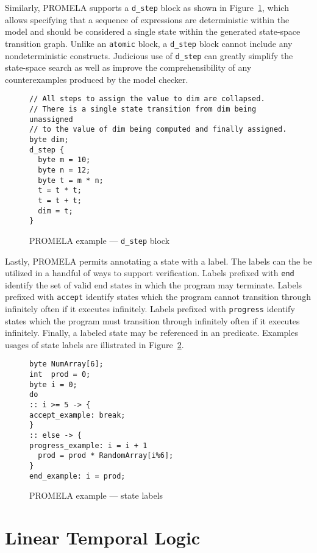 Similarly, PROMELA supports a \texttt{d\_step} block as shown in Figure\ \ref{fig:dstep}, which allows specifying that a sequence of expressions are deterministic within the model and should be considered a single state within the generated state-space transition graph.
Unlike an \texttt{atomic} block, a \texttt{d\_step} block cannot include any nondeterministic constructs.
Judicious use of \texttt{d\_step} can greatly simplify the state-space search as well as improve the comprehensibility of any counterexamples produced by the model checker.

\begin{figure}
\centering
\caption{\label{fig:dstep}PROMELA example --- \texttt{d\_step} block}
\begin{verbatim}
// All steps to assign the value to dim are collapsed.
// There is a single state transition from dim being unassigned
// to the value of dim being computed and finally assigned.
byte dim;
d_step {
  byte m = 10;
  byte n = 12;
  byte t = m * n; 
  t = t * t;
  t = t + t;
  dim = t;
}
\end{verbatim}
\end{figure}

Lastly, PROMELA permits annotating a state with a label.
The labels can the be utilized in a handful of ways to support verification.
Labels prefixed with \texttt{end} identify the set of valid end states in which the program may terminate.
Labels prefixed with \texttt{accept} identify states which the program cannot transition through infinitely often if it executes infinitely.
Labels prefixed with \texttt{progress} identify states which the program must transition through infinitely often if it executes infinitely.
Finally, a labeled state may be referenced in an  predicate.
Examples usages of state labels are illistrated in Figure\ \ref{fig:state-label}.

\begin{figure}
\caption{\label{fig:state-label}PROMELA example --- state labels}
\begin{verbatim}
byte NumArray[6];
int  prod = 0;
byte i = 0;
do
:: i >= 5 -> { 
accept_example: break;
}
:: else -> {
progress_example: i = i + 1
  prod = prod * RandomArray[i%6];
}
end_example: i = prod;
\end{verbatim}
\end{figure}


\hypertarget{sec:linear-temporal-logic}{%
\section{Linear Temporal Logic}\label{sec:linear-temporal-logic}}

